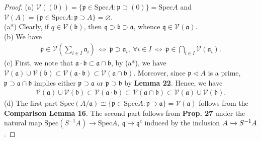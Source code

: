 \documentclass[12pt,a4paper,footinclude=true,headinclude=true]{scrbook} %
\begin{document}
\begin{proof}
    (a) $\mathcal{V}((0))=\{\mathfrak{p}\in\mathrm{Spec}A:\mathfrak{p}\supset(0)\}=\mathrm{Spec}A$ and $\mathcal{V}(A)=\{\mathfrak{p}\in\mathrm{Spec}A:\mathfrak{p}\supset A\}=\varnothing$.\\
    (a*) Clearly, if $q\in\mathcal{V}(\mathfrak{b})$, then $\mathfrak{q}\supset\mathfrak{b}\supset\mathfrak{a}$, whence $\mathfrak{q}\in\mathcal{V}(\mathfrak{a})$.\\
    (b) We have
    \begin{align*}
        \mathfrak{p}\in\mathcal{V}(\sum_{i\in I}\mathfrak{a}_i)\ \Longleftrightarrow\  \mathfrak{p}\supset\mathfrak{a}_i,\ \forall i\in I\ \Longleftrightarrow\  \mathfrak{p}\in\bigcap_{i\in I}\mathcal{V}(\mathfrak{a}_i). 
    \end{align*}
    (c) First, we note that $\mathfrak{a}\cdot\mathfrak{b}\subset\mathfrak{a}\cap\mathfrak{b}$, by (a*), we have $\mathcal{V}(\mathfrak{a})\cup\mathcal{V}(\mathfrak{b})\subset\mathcal{V}(\mathfrak{a}\cdot\mathfrak{b})\subset\mathcal{V}(\mathfrak{a}\cap\mathfrak{b})$. Moreover, since $\mathfrak{p}\triangleleft A$ is a prime, $\mathfrak{p}\supset\mathfrak{a}\cap\mathfrak{b}$ implies either $\mathfrak{p}\supset\mathfrak{a}$ or $\mathfrak{p}\supset\mathfrak{b}$ by \textbf{Lemma 22}. Hence, we have
    \begin{align*}
        \mathcal{V}(\mathfrak{a})\cup\mathcal{V}(\mathfrak{b})\subset\mathcal{V}(\mathfrak{a}\cdot\mathfrak{b})\subset\mathcal{V}(\mathfrak{a}\cap\mathfrak{b})\subset\mathcal{V}(\mathfrak{a})\cup\mathcal{V}(\mathfrak{b}).
    \end{align*}
    (d) The first part $\mathrm{Spec}(A/\mathfrak{a})\cong\{\mathfrak{p}\in\mathrm{Spec}A:\mathfrak{p}\supset\mathfrak{a}\}=\mathcal{V}(\mathfrak{a})$ follows from the \textbf{Comparison Lemma 16}. The second part follows from \textbf{Prop. 27} under the natural map $\mathrm{Spec}(S^{-1}A)\to\mathrm{Spec}A,\ \mathfrak{q}\mapsto\mathfrak{q}^c$ induced by the inclusion $A\xhookrightarrow{} S^{-1}A$.
\end{proof}
\end{document}
